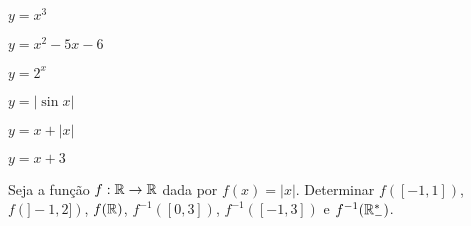 \documentclass[12pt]{article}
\begin{document}
\begin{enumerate}[label={\alph*})]
\begin{multicols}{2}
\item $y = x^3$
\item $y = x^2 - 5x - 6$
\item $y = 2^x$
\item $y = | \sin x |$
\item $y = x + | x |$
\item $y = x + 3$
\end{multicols}
\end{enumerate}

\vesp

\questao Seja a fun{\c c}{\~a}o $f : \mathbb{R} \to \mathbb{R}$ dada por $f(x) = | x |$. Determinar $f([-1,1])$, $f(]-1,2])$, $f(\mathbb{R})$, $f^{-1}([0,3])$, $f^{-1}([-1,3])$ e $f^{-1}(\mathbb{R}_-^*)$.
\end{document}
